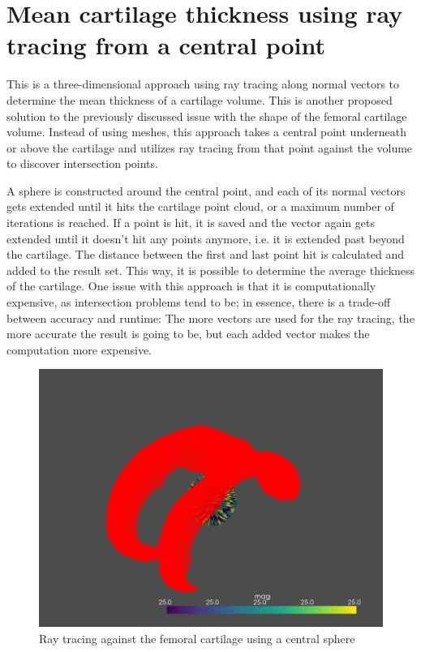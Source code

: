 \section{Mean cartilage thickness using ray tracing from a central point}
This is a three-dimensional approach using ray tracing along normal vectors to determine the mean thickness of a cartilage volume. This is another proposed solution to the previously discussed issue with the shape of the femoral cartilage volume. Instead of using meshes, this approach takes a central point underneath or above the cartilage and utilizes ray tracing from that point against the volume to discover intersection points. 
\par
A sphere is constructed around the central point, and each of its normal vectors gets extended until it hits the cartilage point cloud, or a maximum number of iterations is reached. If a point is hit, it is saved and the vector again gets extended until it doesn't hit any points anymore, i.e. it is extended past beyond the cartilage. The distance between the first and last point hit is calculated and added to the result set. This way, it is possible to determine the average thickness of the cartilage. One issue with this approach is that it is computationally expensive, as intersection problems tend to be; in essence, there is a trade-off between accuracy and runtime: The more vectors are used for the ray tracing, the more accurate the result is going to be, but each added vector makes the computation more expensive.
\begin{figure}[htb!]
	\centering
	\includegraphics[width=\linewidth]{./figures/s5}
	\caption{Ray tracing against the femoral cartilage using a central sphere}
	\label{fig:femoral_sphere}
\end{figure}

